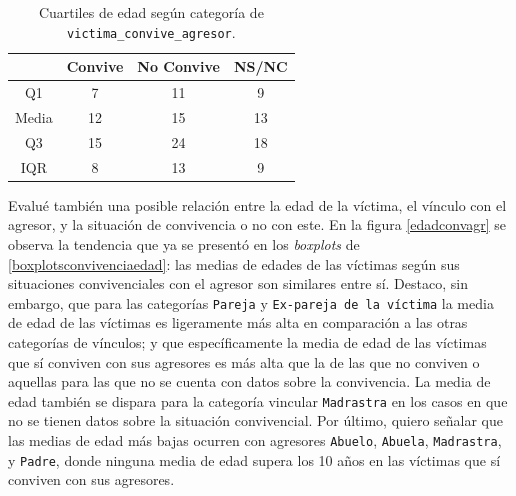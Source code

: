 \documentclass[10 pt]{article}
\begin{document}
\begin{table}[H]
    \begin{center}
    \caption{Cuartiles de edad según categoría de \texttt{victima\_convive\_agresor}.}
    \label{cuartilesconviveedad}
    \begin{tabular}{cccc}
    \hline
    \multicolumn{1}{r}{\textbf{}} & \textbf{Convive} & \textbf{No Convive} & \textbf{ NS/NC} \\ \hline
    Q1                            & 7                    & 11                   & 9                       \\
    Media                         & 12                   & 15                   & 13                      \\
    Q3                            & 15                   & 24                   & 18                      \\
    IQR                           & 8                   & 13                   & 9                     \\ \hline
    \end{tabular}
    \end{center}
    \end{table}


Evalué también una posible relación entre la edad de la víctima, el vínculo con el agresor, y la situación de convivencia o no con este. En la figura \ref{edadconvagr} se observa la tendencia que ya se presentó en los \textit{boxplots} de \ref{boxplotsconvivenciaedad}: las medias de edades de las víctimas según sus situaciones convivenciales con el agresor son similares entre sí. Destaco, sin embargo, que para las categorías \texttt{Pareja} y \texttt{Ex-pareja de la víctima} la media de edad de las víctimas es ligeramente más alta en comparación a las otras categorías de vínculos; y que específicamente la media de edad de las víctimas que sí conviven con sus agresores es más alta que la de las que no conviven o aquellas para las que no se cuenta con datos sobre la convivencia. La media de edad también se dispara para la categoría vincular \texttt{Madrastra} en los casos en que no se tienen datos sobre la situación convivencial. Por último, quiero señalar que las medias de edad más bajas ocurren con agresores \texttt{Abuelo}, \texttt{Abuela}, \texttt{Madrastra}, y \texttt{Padre}, donde ninguna media de edad supera los 10 años en las víctimas que sí conviven con sus agresores.
\end{document}
